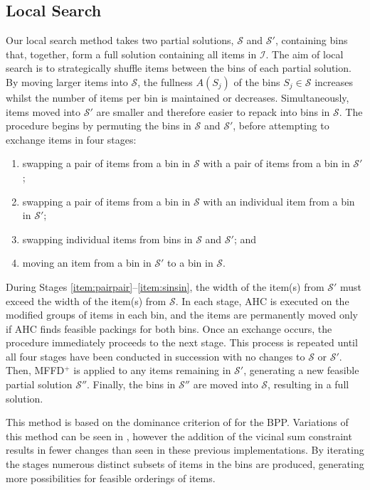 \documentclass[authoryear]{elsarticle}
\begin{document}
\subsection{Local Search}
\label{sub:localsearch}
\noindent Our local search method takes two partial solutions, $\mathcal{S}$ and $\mathcal{S}'$, containing bins that, together, form a full solution containing all items in $\mathcal{I}$. The aim of local search is to strategically shuffle items between the bins of each partial solution. By moving larger items into $\mathcal{S}$, the fullness $A(S_j)$ of the bins $S_j \in \mathcal{S}$ increases whilst the number of items per bin is maintained or decreases. Simultaneously, items moved into $\mathcal{S}'$ are smaller and therefore easier to repack into bins in $\mathcal{S}$. The procedure begins by permuting the bins in $\mathcal{S}$ and $\mathcal{S}'$, before attempting to exchange items in four stages:
\begin{enumerate}[label={(\arabic*)},itemsep=-2pt,topsep=2pt]
	\item swapping a pair of items from a bin in $\mathcal{S}$ with a pair of items from a bin in $\mathcal{S}'$;\label{item:pairpair}
	\item swapping a pair of items from a bin in $\mathcal{S}$ with an individual item from a bin in $\mathcal{S}'$;\label{item:pairsin}
	\item swapping individual items from bins in $\mathcal{S}$ and $\mathcal{S}'$;\label{item:sinsin} and
	\item moving an item from a bin in $\mathcal{S}'$ to a bin in $\mathcal{S}$.\label{item:movesin}
\end{enumerate} 
During Stages \ref{item:pairpair}--\ref{item:sinsin}, the width of the item(s) from $\mathcal{S}'$ must exceed the width of the item(s) from $\mathcal{S}$. In each stage, AHC is executed on the modified groups of items in each bin, and the items are permanently moved only if AHC finds feasible packings for both bins. Once an exchange occurs, the procedure immediately proceeds to the next stage. This process is repeated until all four stages have been conducted in succession with no changes to $\mathcal{S}$ or $\mathcal{S}'$. Then, MFFD$^+$ is applied to any items remaining in $\mathcal{S}'$, generating a new feasible partial solution $\mathcal{S}''$. Finally, the bins in $\mathcal{S}''$ are moved into $\mathcal{S}$, resulting in a full solution.

This method is based on the dominance criterion of \citet{martello1990l} for the BPP. Variations of this method can be seen in \citet{lewis2009, lewis2017, falkenauer1996, levine2004}, however the addition of the vicinal sum constraint results in fewer changes than seen in these previous implementations. By iterating the stages numerous distinct subsets of items in the bins are produced, generating more possibilities for feasible orderings of items.
\end{document}
